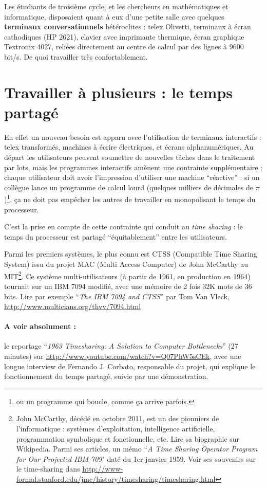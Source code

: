 \begin{multicols}{2}
Les étudiants de troisième cycle, et les chercheurs en mathématiques
et informatique, disposaient quant à eux d'une petite salle avec
quelques \textbf{terminaux conversationnels} hétéroclites : telex
Olivetti, terminaux à écran cathodiques (HP 2621), clavier avec imprimante
thermique, écran graphique Textronix 4027, reliées directement au
centre de calcul par des lignes à 9600 bit/s. De quoi travailler très confortablement.


\section{Travailler à plusieurs : le temps partagé} 

En effet un nouveau besoin est apparu avec l'utilisation de terminaux
interactifs : telex transformés, machines à écrire électriques, et
écrans alphanumériques.  Au départ les utilisateurs peuvent soumettre
de nouvelles tâches dans le traitement par lots, mais les programmes
interactifs amènent une contrainte supplémentaire : chaque utilisateur
doit avoir l'impression d'utiliser une machine ``réactive'' : si un
collègue lance un programme de calcul lourd (quelques milliers de
décimales de $\pi$)\footnote{ou un programme qui boucle, comme ça
  arrive parfois.}, ça ne doit pas empêcher les autres de travailler
en monopolisant le temps du processeur.


C'est la prise en compte de cette contrainte qui conduit au \emph{time
  sharing} : le temps du processeur est partagé ``équitablement''
entre les utilisateurs.

 
Parmi les premiers systèmes, le plus connu est CTSS (Compatible Time
Sharing System) issu du projet MAC (Multi Access Computer) de John
McCarthy au MIT\footnote{ John McCarthy, décédé en octobre 2011, est
  un des pionniers de l'informatique : systèmes d'exploitation,
  intelligence artificielle, programmation symbolique et
  fonctionnelle, etc. Lire sa biographie sur Wikipedia. Parmi ses
  articles, un mémo ``\emph{A Time Sharing Operator Program for Our
    Projected IBM 709}" daté du 1er janvier 1959.  Voir ses souvenirs
  sur le time-sharing dans
  \url{http://www-formal.stanford.edu/jmc/history/timesharing/timesharing.html}
}.  Ce système multi-utilisateurs (à partir de 1961, en production en
1964) tournait sur un IBM 7094 modifié, avec une mémoire de 2 fois 32K
mots de 36 bits.  Lire par exemple ``\emph{The IBM 7094 and CTSS}''
par Tom Van Vleck, \url{http://www.multicians.org/thvv/7094.html}

\paragraph{A voir absolument : } le reportage  ``\emph{1963 Timesharing: A Solution to Computer
  Bottlenecks}'' (27 minutes) sur
\url{http://www.youtube.com/watch?v=Q07PhW5sCEk}, avec une longue
interview de Fernando J. Corbato, responsable du projet, qui explique le fonctionnement du temps partagé, suivie par
une démonstration.


\end{multicols}
